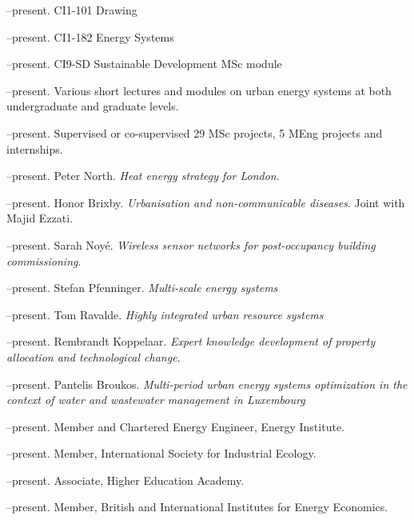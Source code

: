\documentclass[11pt,a4paper]{article}
\begin{document}
\noindent{}%

\bigskip

\noindent{}%

\bigskip 

\noindent{}%

\bigskip

\newpage
\noindent{}%
%
--present.  CI{1-101} Drawing

--present.  CI{1-182} Energy Systems

--present.  CI{9-SD} Sustainable Development MSc module

--present. Various short lectures and modules on urban energy systems at both undergraduate and graduate levels.
 
--present. Supervised or co-supervised 29 MSc projects, 5 MEng projects and internships.

\bigskip
\noindent{}%
--present.  Peter North. \emph{Heat energy strategy for London}.

--present.  Honor Brixby. \emph{Urbanisation and non-communicable diseases}.  Joint with Majid Ezzati.

--present.  Sarah Noy\'{e}. \emph{Wireless sensor networks for post-occupancy building commissioning}.  

--present.  Stefan Pfenninger. \emph{Multi-scale energy systems}

--present.  Tom Ravalde. \emph{Highly integrated urban resource systems}

--present.  Rembrandt Koppelaar. \emph{Expert knowledge development of property allocation and technological change}.

--present.  Pantelis Broukos. \emph{Multi-period urban energy systems optimization in the context of water and wastewater management in Luxembourg}
\bigskip

\noindent{}%
%
--present.  Member and Chartered Energy Engineer, Energy Institute.

--present.  Member, International Society for Industrial Ecology.

--present.  Associate, Higher Education Academy.

--present.  Member, British and International Institutes for Energy Economics.
\end{document}
